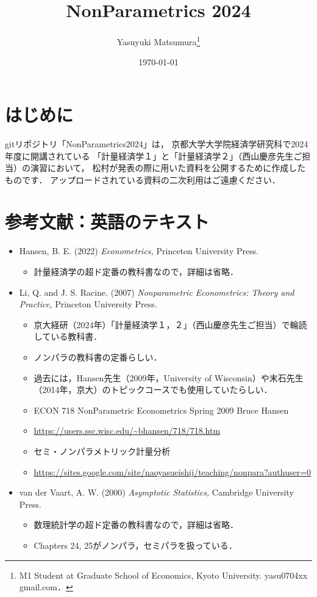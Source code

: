 \documentclass[a4paper,10pt]{jarticle}
\title{NonParametrics 2024}
\author{Yasuyuki Matsumura\thanks{M1 Student at Graduate School of Economics, Kyoto University. yasu0704xx \text{@} gmail.com．}}
\date{\today} %
\begin{document}
\maketitle %

\setcounter{section}{-1}
\section{はじめに}

gitリポジトリ「NonParametrics2024」は，
京都大学大学院経済学研究科で2024年度に開講されている
「計量経済学１」と「計量経済学２」（西山慶彦先生ご担当）の演習において，
松村が発表の際に用いた資料を公開するために作成したものです．
アップロードされている資料の二次利用はご遠慮ください．


\section{参考文献：英語のテキスト}

\begin{itemize}
  \item Hansen, B. E. (2022)
        \textit{Econometrics,} Princeton University Press.
        \begin{itemize}
          \item 計量経済学の超ド定番の教科書なので，詳細は省略．
        \end{itemize}
  
  \item Li, Q. and J. S. Racine. (2007)
        \textit{Nonparametric Econometrics: Theory and Practice,} 
        Princeton University Press.

        \begin{itemize}
        \item 京大経研（2024年）「計量経済学１，２」（西山慶彦先生ご担当）で輪読している教科書．
        \item ノンパラの教科書の定番らしい．
        \item 過去には，Hansen先生（2009年，University of Wisconsin）や末石先生（2014年，京大）のトピックコースでも使用していたらしい．
        \item ECON 718 NonParametric Econometrics Spring 2009 Bruce Hansen 
        \item \url{https://users.ssc.wisc.edu/~bhansen/718/718.htm}
        \item セミ・ノンパラメトリック計量分析 
        \item \url{https://sites.google.com/site/naoyasueishij/teaching/nonpara?authuser=0}
        \end{itemize}
  
  \item van der Vaart, A. W. (2000) 
  \textit{Asymptotic Statistics,} Cambridge University Press.
        \begin{itemize}
          \item 数理統計学の超ド定番の教科書なので，詳細は省略．
          \item Chapters 24, 25がノンパラ，セミパラを扱っている．
        \end{itemize}

\end{itemize}
\end{document}
